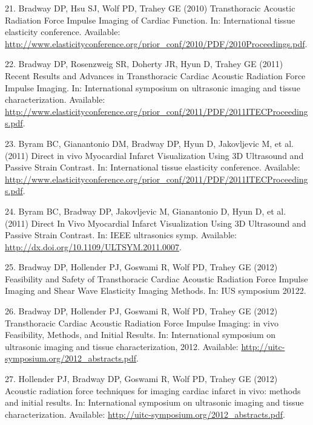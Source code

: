 \documentclass[letterpaper,10pt,english]{sphinxmanual}
\begin{document}
21. Bradway DP, Hsu SJ, Wolf PD, Trahey GE (2010) Transthoracic Acoustic
Radiation Force Impulse Imaging of Cardiac Function. In: International
tissue elasticity conference. Available:
\href{http://www.elasticityconference.org/prior\_conf/2010/PDF/2010Proceedings.pdf}{http://www.elasticityconference.org/prior\_conf/2010/PDF/2010Proceedings.pdf}.

22. Bradway DP, Rosenzweig SR, Doherty JR, Hyun D, Trahey GE (2011)
Recent Results and Advances in Transthoracic Cardiac Acoustic Radiation
Force Impulse Imaging. In: International symposium on ultrasonic imaging
and tissue characterization. Available:
\href{http://www.elasticityconference.org/prior\_conf/2011/PDF/2011ITECProceedings.pdf}{http://www.elasticityconference.org/prior\_conf/2011/PDF/2011ITECProceedings.pdf}.

23. Byram BC, Gianantonio DM, Bradway DP, Hyun D, Jakovljevic M, et al.
(2011) Direct in vivo Myocardial Infarct Visualization Using 3D
Ultrasound and Passive Strain Contrast. In: International tissue
elasticity conference. Available:
\href{http://www.elasticityconference.org/prior\_conf/2011/PDF/2011ITECProceedings.pdf}{http://www.elasticityconference.org/prior\_conf/2011/PDF/2011ITECProceedings.pdf}.

24. Byram BC, Bradway DP, Jakovljevic M, Gianantonio D, Hyun D, et al.
(2011) Direct In Vivo Myocardial Infarct Visualization Using 3D
Ultrasound and Passive Strain Contrast. In: IEEE ultrasonics symp.
Available: \href{http://dx.doi.org/10.1109/ULTSYM.2011.0007}{http://dx.doi.org/10.1109/ULTSYM.2011.0007}.

25. Bradway DP, Hollender PJ, Goswami R, Wolf PD, Trahey GE (2012)
Feasibility and Safety of Transthoracic Cardiac Acoustic Radiation Force
Impulse Imaging and Shear Wave Elasticity Imaging Methods. In: IUS
symposium 20122.

26. Bradway DP, Hollender PJ, Goswami R, Wolf PD, Trahey GE (2012)
Transthoracic Cardiac Acoustic Radiation Force Impulse Imaging: in vivo
Feasibility, Methods, and Initial Results. In: International symposium
on ultrasonic imaging and tissue characterization, 2012. Available:
\href{http://uitc-symposium.org/2012\_abstracts.pdf}{http://uitc-symposium.org/2012\_abstracts.pdf}.

27. Hollender PJ, Bradway DP, Goswami R, Wolf PD, Trahey GE (2012)
Acoustic radiation force techniques for imaging cardiac infarct in vivo:
methods and initial results. In: International symposium on ultrasonic
imaging and tissue characterization. Available:
\href{http://uitc-symposium.org/2012\_abstracts.pdf}{http://uitc-symposium.org/2012\_abstracts.pdf}.
\end{document}
